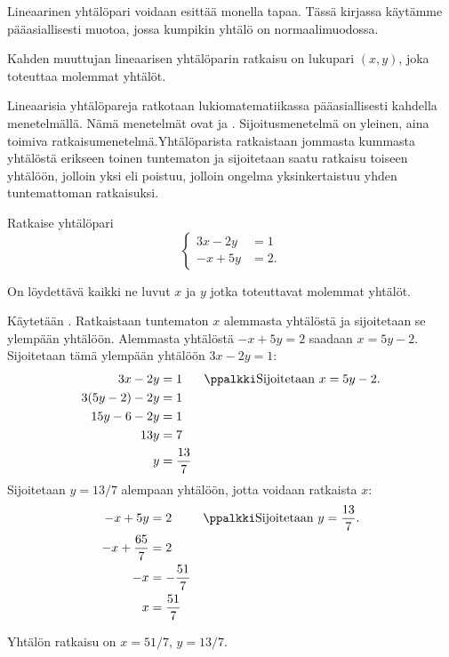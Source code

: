 Lineaarinen yhtälöpari voidaan esittää monella tapaa. Tässä kirjassa käytämme pääasiallisesti muotoa, jossa kumpikin yhtälö on normaalimuodossa.


Kahden muuttujan lineaarisen yhtälöparin ratkaisu on lukupari $(x, y)$, joka toteuttaa molemmat yhtälöt.

Lineaarisia yhtälöpareja ratkotaan lukiomatematiikassa pääasiallisesti kahdella menetelmällä. Nämä menetelmät ovat  ja . Sijoitusmenetelmä on yleinen, aina toimiva ratkaisumenetelmä.Yhtälöparista ratkaistaan jommasta kummasta yhtälöstä erikseen toinen tuntematon ja sijoitetaan saatu ratkaisu toiseen yhtälöön, jolloin yksi  eli poistuu, jolloin ongelma yksinkertaistuu yhden tuntemattoman ratkaisuksi.

\begin{esimerkki}
Ratkaise yhtälöpari
\[
\left\{
\begin{aligned}
3x-2y&= 1 \\
-x+5y&= 2.
\end{aligned}
\right.
\]
\begin{esimratk}
On löydettävä kaikki ne luvut $x$ ja $y$ jotka toteuttavat molemmat yhtälöt.

Käytetään . Ratkaistaan tuntematon $x$ alemmasta yhtälöstä ja sijoitetaan se ylempään yhtälöön. Alemmasta yhtälöstä $-x+5y= 2$ saadaan $x=5y-2$. Sijoitetaan tämä ylempään yhtälöön $3x-2y=1$:
\begin{align*}
3x-2y&=1 && \ppalkki \text{Sijoitetaan $x=5y-2$.} \\
3(5y-2)-2y&=1 && \\
15y-6-2y&=1 && \\
13y&=7 && \\
y&=\frac{13}{7} && \\
\end{align*}
Sijoitetaan $y=13/7$ alempaan yhtälöön, jotta voidaan ratkaista $x$:
\begin{align*}
-x+5y&= 2 && \ppalkki \text{Sijoitetaan $y=\frac{13}{7}$.} \\
-x+\frac{65}{7}&= 2 && \\
-x&= -\frac{51}{7}&& \\
x&= \frac{51}{7}&&
\end{align*}
\end{esimratk}
\begin{esimvast}
Yhtälön ratkaisu on $x= 51/7$, $y=13/7$.
\end{esimvast}
\end{esimerkki}

